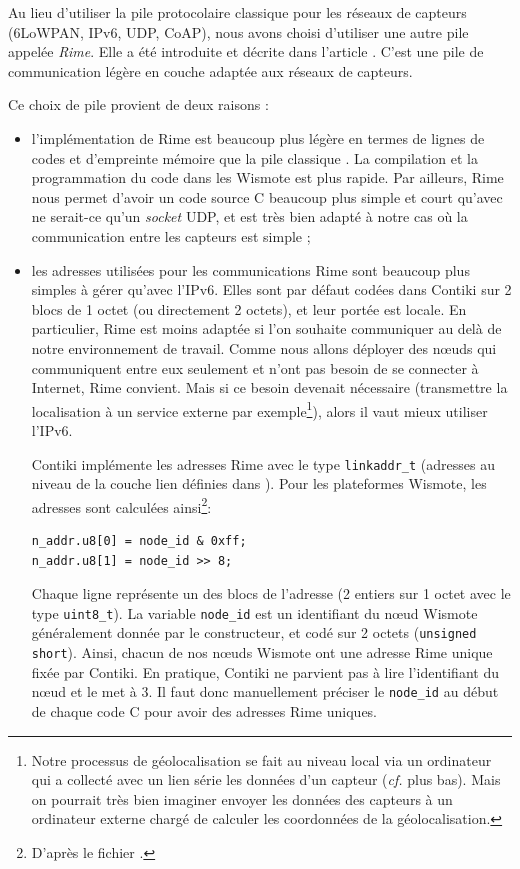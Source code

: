 \documentclass[french, a4paper, 12pt, parskip]{scrartcl}
\begin{document}
Au lieu d'utiliser la pile protocolaire classique pour les réseaux de capteurs
(6LoWPAN, IPv6, UDP, CoAP), nous avons choisi d'utiliser une autre pile
appelée \textit{Rime}. Elle a été introduite et décrite dans l'article
\cite{Rime}. C'est une pile de communication légère en couche adaptée aux
réseaux de capteurs.

Ce choix de pile provient de deux raisons :
\begin{itemize}
  \item l'implémentation de Rime est beaucoup plus légère en termes de lignes
    de codes et d'empreinte mémoire que la pile classique \cite{Rime}. La
    compilation et la programmation du code dans les Wismote est plus rapide.
    Par ailleurs, Rime nous permet d'avoir un code source C beaucoup plus
    simple et court qu'avec ne serait-ce qu'un \textit{socket} UDP, et est très
    bien adapté à notre cas où la communication entre les capteurs est simple ;
  \item
    les adresses utilisées pour les communications Rime sont beaucoup plus
    simples à gérer qu'avec l'IPv6. Elles sont par défaut codées dans Contiki
    sur 2 blocs de 1 octet (ou directement 2 octets), et leur portée est
    locale. En particulier, Rime est moins adaptée si l'on souhaite communiquer
    au delà de notre environnement de travail. Comme nous allons déployer des
    nœuds qui communiquent entre eux seulement et n'ont pas besoin de se
    connecter à Internet, Rime convient. Mais si ce besoin devenait nécessaire
    (transmettre la localisation à un service externe par
    exemple\footnote{Notre processus de géolocalisation se fait au niveau local
    via un ordinateur qui a collecté avec un lien série les données d'un
    capteur (\textit{cf.} plus bas). Mais on pourrait très bien imaginer
    envoyer les données des capteurs à un ordinateur externe chargé de calculer
    les coordonnées de la géolocalisation.}), alors il vaut mieux utiliser
    l'IPv6.

    Contiki implémente les adresses Rime avec le type \verb+linkaddr_t+
    (adresses au niveau de la couche lien définies dans
    ). Pour les plateformes Wismote, les adresses
    sont calculées ainsi\footnote{D'après le fichier
    .}:
    \begin{verbatim}
n_addr.u8[0] = node_id & 0xff;
n_addr.u8[1] = node_id >> 8;
    \end{verbatim}
    Chaque ligne représente un des blocs de l'adresse (2 entiers sur 1 octet
    avec le type \verb+uint8_t+). La variable \verb+node_id+ est un identifiant
    du nœud Wismote généralement donnée par le constructeur, et codé sur 2
    octets (\verb+unsigned short+). Ainsi, chacun de nos nœuds Wismote ont une
    adresse Rime unique fixée par Contiki. En pratique, Contiki ne parvient pas
    à lire l'identifiant du nœud et le met à $3$. Il faut donc manuellement
    préciser le \verb+node_id+ au début de chaque code C pour avoir des
    adresses Rime uniques.
\end{itemize}
\end{document}
